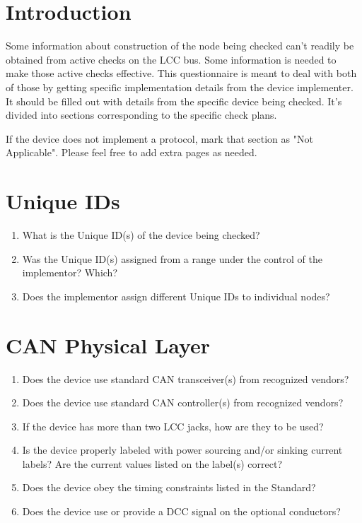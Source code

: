 



\maketitle
\thispagestyle{firststyle}

\section{Introduction}

Some information about construction of the node being checked can't readily be obtained
from active checks on the LCC bus. Some information is needed to make those active 
checks effective.  This questionnaire is meant to deal with both of those
by getting specific implementation details from the device implementer.
It should be filled out with details from the specific device being checked.
It's divided into sections corresponding to the specific check plans.

If the device does not implement a protocol, mark that section as "Not Applicable".
Please feel free to add extra pages as needed.

\section{Unique IDs}
    \begin{enumerate}
        \item What is the Unique ID(s) of the device being checked?
        \item Was the Unique ID(s) assigned from a range under the control of the implementor? 
            Which?
        \item Does the implementor assign different Unique IDs to individual nodes?
    \end{enumerate}

\section{CAN Physical Layer}
    \begin{enumerate}
        \item Does the device use standard CAN transceiver(s) from recognized vendors?
        \item Does the device use standard CAN controller(s) from recognized vendors?
        \item If the device has more than two LCC jacks, how are they to be used?
        \item Is the device properly labeled with power sourcing and/or sinking current labels?
            Are the current values listed on the label(s) correct?
        \item Does the device obey the timing constraints listed in the Standard?
        \item Does the device use or provide a DCC signal on the optional conductors?
    \end{enumerate}

